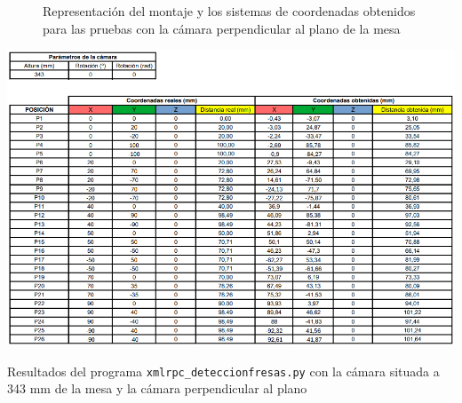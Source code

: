    \begin{figure}[H]
      \begin{center}
        \subcapcentertrue
        \hspace{1mm}
      \end{center}
      \caption{Representación del montaje y los sistemas de coordenadas obtenidos para las pruebas con la cámara perpendicular al plano de la mesa}
      \label{fig:deteccion_plano_perpendicular}
    \end{figure}
   
    
    \begin{table}[H]
     \centering
     \begin{center}
       \includegraphics[width=155mm]{figs/Resultados 343 mm 0 grados.png}
     \end{center}
     \caption{Resultados del programa \texttt{xmlrpc\_deteccionfresas.py} con la cámara situada a 343 mm de la mesa y la cámara perpendicular al plano}
     \label{tab:resultados_343mm_0grados}
  \end{table}



